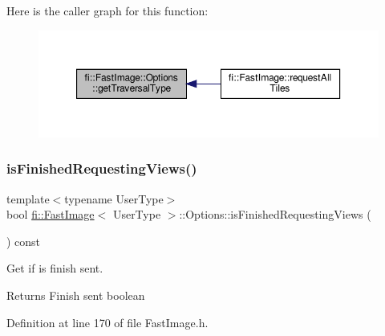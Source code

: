 Here is the caller graph for this function\+:
\nopagebreak
\begin{figure}[H]
\begin{center}
\leavevmode
\includegraphics[width=350pt]{dc/db9/classfi_1_1FastImage_1_1Options_a8f422b375446460e2200597fd064e79c_icgraph}
\end{center}
\end{figure}
\mbox{\label{classfi_1_1FastImage_1_1Options_a3cfa4c38cdb0b2018c812bbcb8e9dd63}} 
\subsubsection{\texorpdfstring{is\+Finished\+Requesting\+Views()}{isFinishedRequestingViews()}}
{\footnotesize\ttfamily template$<$typename User\+Type$>$ \\
bool \hyperlink{classfi_1_1FastImage}{fi\+::\+Fast\+Image}$<$ User\+Type $>$\+::Options\+::is\+Finished\+Requesting\+Views (\begin{DoxyParamCaption}{ }\end{DoxyParamCaption}) const\hspace{0.3cm}{\ttfamily [inline]}}



Get if is finish sent. 

\begin{DoxyReturn}{Returns}
Finish sent boolean 
\end{DoxyReturn}


Definition at line 170 of file Fast\+Image.\+h.

